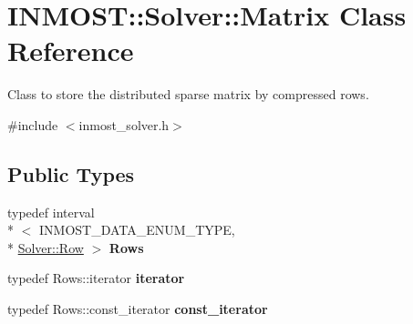 \hypertarget{classINMOST_1_1Solver_1_1Matrix}{\section{I\-N\-M\-O\-S\-T\-:\-:Solver\-:\-:Matrix Class Reference}
\label{classINMOST_1_1Solver_1_1Matrix}
}


Class to store the distributed sparse matrix by compressed rows.  




{\ttfamily \#include $<$inmost\-\_\-solver.\-h$>$}

\subsection*{Public Types}
\begin{DoxyCompactItemize}
\item 
\hypertarget{classINMOST_1_1Solver_1_1Matrix_ac275fa5bfc1fafa6bc2a835b5d02af59}{typedef interval\\*
$<$ I\-N\-M\-O\-S\-T\-\_\-\-D\-A\-T\-A\-\_\-\-E\-N\-U\-M\-\_\-\-T\-Y\-P\-E, \\*
\hyperlink{classINMOST_1_1Solver_1_1Row}{Solver\-::\-Row} $>$ {\bfseries Rows}}\label{classINMOST_1_1Solver_1_1Matrix_ac275fa5bfc1fafa6bc2a835b5d02af59}

\item 
\hypertarget{classINMOST_1_1Solver_1_1Matrix_a965cdedb8d1c4f49af98f82c899f308f}{typedef Rows\-::iterator {\bfseries iterator}}\label{classINMOST_1_1Solver_1_1Matrix_a965cdedb8d1c4f49af98f82c899f308f}

\item 
\hypertarget{classINMOST_1_1Solver_1_1Matrix_a0bbe620bd66a02289a68ba29e5d40d56}{typedef Rows\-::const\-\_\-iterator {\bfseries const\-\_\-iterator}}\label{classINMOST_1_1Solver_1_1Matrix_a0bbe620bd66a02289a68ba29e5d40d56}

\end{DoxyCompactItemize}
